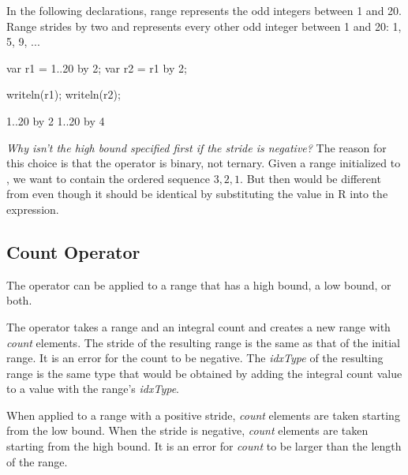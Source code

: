 \begin{example}
In the following declarations, range  represents the odd integers
between 1 and 20. Range  strides  by two and represents
every other odd integer between 1 and 20: 1, 5, 9, ...
\begin{chapelpre}
\end{chapelpre}
\begin{chapel}
var r1 = 1..20 by 2;
var r2 = r1 by 2;
\end{chapel}
\begin{chapelpost}
writeln(r1);
writeln(r2);
\end{chapelpost}
\begin{chapeloutput}
1..20 by 2
1..20 by 4
\end{chapeloutput}
\end{example}

\begin{rationale}
{\it Why isn't the high bound specified first if the stride is
negative?}  The reason for this choice is that the  operator
is binary, not ternary.  Given a range  initialized
to , we want  to contain the ordered sequence
$3,2,1$.  But then  would be different from  even though it should be identical by substituting the value in
R into the expression.
\end{rationale}

\subsection{Count Operator}
\label{Count_Operator}

The \chpl{#} operator can be applied to a range that has a high bound,
a low bound, or both.

The \chpl{#} operator takes a range and an integral count and creates
a new range with \emph{count} elements. The stride of the resulting range is
the same as that of the initial range. It is an error for the count to
be negative.  The \emph{idxType} of the resulting range is the same
type that would be obtained by adding the integral count value to a value
with the range's \emph{idxType}.

When applied to a  range with a positive
stride, \emph{count} elements are taken starting from the low
bound. When the stride is negative, \emph{count} elements are taken
starting from the high bound. It is an error for \emph{count} to be larger
than the length of the range.

